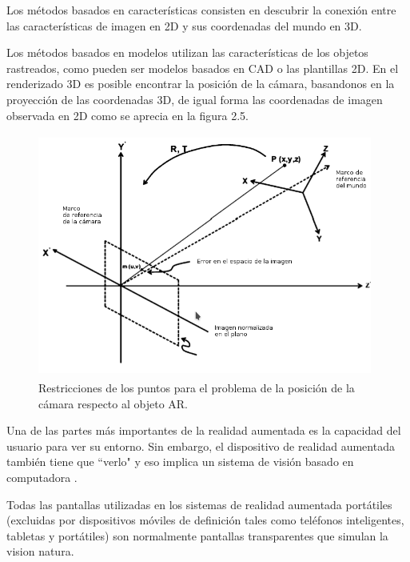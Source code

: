 \vspace{5mm}
Los métodos basados en características consisten en descubrir la conexión entre las características de imagen en 2D y sus coordenadas del mundo en 3D. \par
\vspace{5mm}
Los métodos basados en modelos utilizan las características de los objetos rastreados, como pueden ser modelos basados en CAD o las plantillas 2D. En el renderizado 3D es posible encontrar la posición de la cámara, basandonos en la proyección de las coordenadas 3D, de igual forma las coordenadas de imagen observada en 2D  como se aprecia en la figura 2.5.\par
\begin{figure}[!htbp]
	\centering
	\includegraphics[width=11cm,height=8cm]{imagenes/marcoteorico/ar/tecnologyAR.png}
	\caption{Restricciones de los puntos para el problema de la posición de la cámara respecto al objeto AR\cite{B27}.}
	\label{fig:analogo}
\end{figure}
Una de las partes más importantes de la realidad aumentada es la capacidad del usuario para ver su entorno. Sin embargo, el dispositivo de realidad aumentada también tiene que ``verlo" y eso implica un sistema de visión basado en computadora \cite{B22}.\par
\vspace{5mm}
 Todas las pantallas utilizadas en los sistemas de realidad aumentada portátiles (excluidas por dispositivos móviles de definición tales como teléfonos inteligentes, tabletas y portátiles) son normalmente pantallas transparentes que simulan la vision natura. \par
